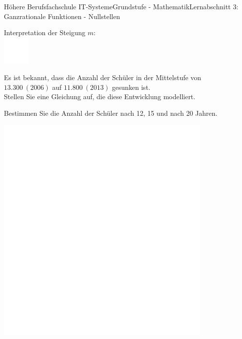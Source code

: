 \documentclass[oneside,openany,headings=optiontotoc,11pt,numbers=noenddot]{scrreprt}
\begin{document}
\begin{worksheet}{Höhere Berufsfachschule IT-Systeme}{Grundstufe - Mathematik}{Lernabschnitt 3: Ganzrationale Funktionen - Nullstellen}
\begin{framed}
		\end{framed}
		\normalsize
		\begin{framed}
			\noindent
			Interpretation der Steigung \(m\):\\
			\includegraphics[width=0.1\textwidth]{../../empty.jpg}\\
		\end{framed}
		\par\bigskip\noindent
		\begin{framed}
			\noindent
			Es ist bekannt, dass die Anzahl der Schüler in der Mittelstufe von \(13.300\ (2006)\) auf \(11.800\ (2013)\) gesunken ist.\\
			Stellen Sie eine Gleichung auf, die diese Entwicklung modelliert.\\
			\par\noindent
			Bestimmen Sie die Anzahl der Schüler nach 12, 15 und nach 20 Jahren.
		\end{framed}
		\begin{framed}
			\includegraphics[width=0.8\textwidth]{../../empty.jpg}
		\end{framed}
		\newpage
		

\end{worksheet}
\end{document}
